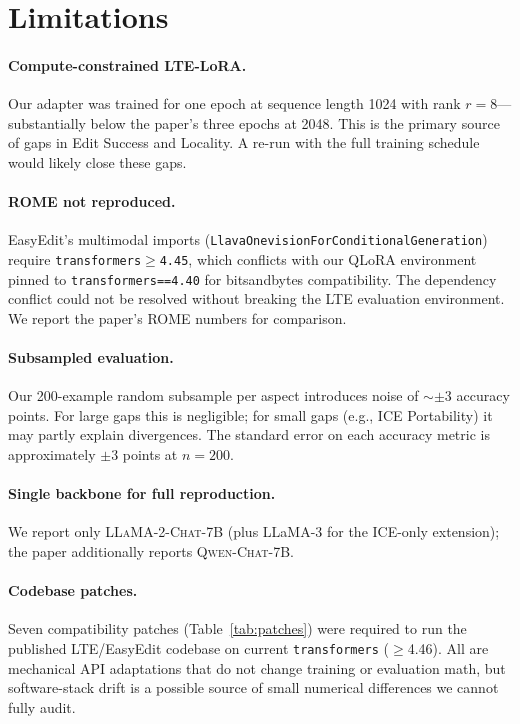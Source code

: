 \documentclass[11pt,a4paper,twocolumn]{article}
\begin{document}
\section{Limitations}
\label{sec:limitations}

\paragraph{Compute-constrained LTE-LoRA.} Our adapter was trained for one epoch at sequence length 1024 with rank $r{=}8$---substantially below the paper's three epochs at 2048. This is the primary source of gaps in Edit Success and Locality. A re-run with the full training schedule would likely close these gaps.

\paragraph{ROME not reproduced.} EasyEdit's multimodal imports (\texttt{LlavaOnevisionForConditionalGeneration}) require \texttt{transformers$\geq$4.45}, which conflicts with our QLoRA environment pinned to \texttt{transformers==4.40} for bitsandbytes compatibility. The dependency conflict could not be resolved without breaking the LTE evaluation environment. We report the paper's ROME numbers for comparison.

\paragraph{Subsampled evaluation.} Our 200-example random subsample per aspect introduces noise of ${\sim}\pm 3$ accuracy points. For large gaps this is negligible; for small gaps (e.g., ICE Portability) it may partly explain divergences. The standard error on each accuracy metric is approximately $\pm 3$ points at $n=200$.

\paragraph{Single backbone for full reproduction.} We report only \textsc{LLaMA-2-Chat-7B} (plus LLaMA-3 for the ICE-only extension); the paper additionally reports \textsc{Qwen-Chat-7B}.

\paragraph{Codebase patches.} Seven compatibility patches (Table~\ref{tab:patches}) were required to run the published LTE/EasyEdit codebase on current \texttt{transformers} ($\geq$4.46). All are mechanical API adaptations that do not change training or evaluation math, but software-stack drift is a possible source of small numerical differences we cannot fully audit.
\end{document}

